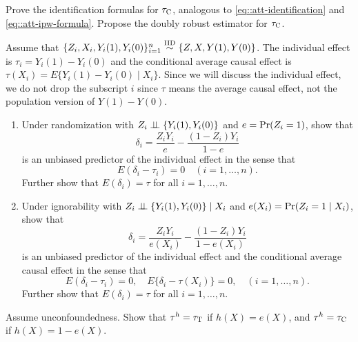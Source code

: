 \begin{HomeworkProblem}\label{exr:13-5}

Prove the identification formulas for $\tau_\textsc{C}$, analogous to \eqref{eq::att-identification} and \eqref{eq::att-ipw-formula}. Propose the doubly robust estimator for $\tau_\textsc{C}$.


\end{HomeworkProblem}

\begin{HomeworkProblem}\label{exr:13-6}

Assume that $\{ Z_i, X_i, Y_i(1), Y_i(0) \}_{i=1}^n \stackrel{\textup{IID}}{\sim} \{ Z, X, Y(1), Y(0) \}$. The individual effect is $\tau_i = Y_i(1) - Y_i(0)$ and the conditional average causal effect is $\tau(X_i) = E\{ Y_i(1) - Y_i(0) \mid X_i  \}$. Since we will discuss the individual effect, we do not drop the subscript $i$ since $\tau$ means the average causal effect, not the population version of $Y(1) - Y(0)$.

\begin{enumerate}
\item
Under randomization with $Z_i\mathrel{\perp\!\!\!\perp} \{ Y_i(1), Y_i(0)  \}$ and $e = \operatorname{Pr}(Z_i = 1)$, show that
\[
\delta_i = \frac{Z_i Y_i}{e} - \frac{(1-Z_i)Y_i}{1-e}
\]
is an unbiased predictor of the individual effect in the sense that
\[
E( \delta_i  -  \tau_i ) = 0\quad (i=1,\ldots, n).
\]
Further show that $E( \delta_i ) = \tau $ for all $i=1,\ldots, n$.

\item
Under ignorability with $Z_i\mathrel{\perp\!\!\!\perp} \{ Y_i(1), Y_i(0)  \}\mid X_i$ and $e(X_i) = \operatorname{Pr}(Z_i=1\mid X_i)$, show that
\[
\delta_i = \frac{Z_i Y_i}{ e(X_i) } - \frac{(1-Z_i)Y_i}{1-e(X_i)}
\]
is an unbiased predictor of the individual effect and the conditional average causal effect in the sense that
\[
E( \delta_i  -  \tau_i ) = 0, \quad
E\{  \delta_i  -  \tau(X_i) \} = 0, \quad (i=1,\ldots, n).
\]
Further show that $E( \delta_i ) = \tau $ for all $i=1,\ldots, n$.
\end{enumerate}



\end{HomeworkProblem}

\begin{HomeworkProblem}\label{exr:13-7}


Assume unconfoundedness.
Show that $\tau^h = \tau_\textsc{T}$ if $h(X) = e(X)$, and $\tau^h = \tau_\textsc{C}$ if $h(X) = 1-  e(X)$.


\end{HomeworkProblem}

